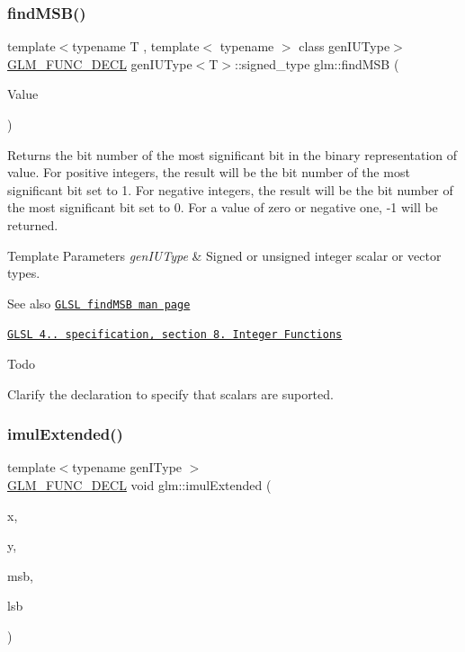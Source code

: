 \subsubsection{\texorpdfstring{find\+M\+S\+B()}{findMSB()}}
{\footnotesize\ttfamily template$<$typename T , template$<$ typename $>$ class gen\+I\+U\+Type$>$ \\
\hyperlink{setup_8hpp_ab2d052de21a70539923e9bcbf6e83a51}{G\+L\+M\+\_\+\+F\+U\+N\+C\+\_\+\+D\+E\+CL} gen\+I\+U\+Type$<$T$>$\+::signed\+\_\+type glm\+::find\+M\+SB (\begin{DoxyParamCaption}\item[{gen\+I\+U\+Type$<$ T $>$ const \&}]{Value }\end{DoxyParamCaption})}

Returns the bit number of the most significant bit in the binary representation of value. For positive integers, the result will be the bit number of the most significant bit set to 1. For negative integers, the result will be the bit number of the most significant bit set to 0. For a value of zero or negative one, -\/1 will be returned.


\begin{DoxyTemplParams}{Template Parameters}
{\em gen\+I\+U\+Type} & Signed or unsigned integer scalar or vector types.\\
\hline
\end{DoxyTemplParams}
\begin{DoxySeeAlso}{See also}
\href{http://www.opengl.org/sdk/docs/manglsl/xhtml/findMSB.xml}{\tt G\+L\+SL find\+M\+SB man page} 

\href{http://www.opengl.org/registry/doc/GLSLangSpec.4.20.8.pdf}{\tt G\+L\+SL 4.. specification, section 8. Integer Functions}
\end{DoxySeeAlso}
\begin{DoxyRefDesc}{Todo}
\item[\hyperlink{todo__todo000003}{Todo}]Clarify the declaration to specify that scalars are suported. \end{DoxyRefDesc}
\mbox{\label{group__core__func__integer_ga7d284e3ea5059cae9fe8f0fe1a76dd02}} 
\subsubsection{\texorpdfstring{imul\+Extended()}{imulExtended()}}
{\footnotesize\ttfamily template$<$typename gen\+I\+Type $>$ \\
\hyperlink{setup_8hpp_ab2d052de21a70539923e9bcbf6e83a51}{G\+L\+M\+\_\+\+F\+U\+N\+C\+\_\+\+D\+E\+CL} void glm\+::imul\+Extended (\begin{DoxyParamCaption}\item[{gen\+I\+Type const \&}]{x,  }\item[{gen\+I\+Type const \&}]{y,  }\item[{gen\+I\+Type \&}]{msb,  }\item[{gen\+I\+Type \&}]{lsb }\end{DoxyParamCaption})}

